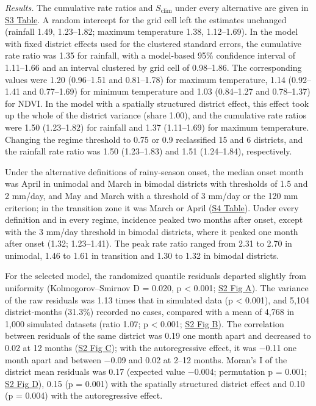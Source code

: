 \documentclass[11pt,a4paper]{article}
\begin{document}
\emph{Results.} The cumulative rate ratios and \(S_{\text{clim}}\) under every alternative are given in \hyperref[s3table]{S3 Table}. A random intercept for the grid cell left the estimates unchanged (rainfall 1.49, 1.23--1.82; maximum temperature 1.38, 1.12--1.69). In the model with fixed district effects used for the clustered standard errors, the cumulative rate ratio was 1.35 for rainfall, with a model-based 95\% confidence interval of 1.11--1.66 and an interval clustered by grid cell of 0.98--1.86. The corresponding values were 1.20 (0.96--1.51 and 0.81--1.78) for maximum temperature, 1.14 (0.92--1.41 and 0.77--1.69) for minimum temperature and 1.03 (0.84--1.27 and 0.78--1.37) for NDVI. In the model with a spatially structured district effect, this effect took up the whole of the district variance (share 1.00), and the cumulative rate ratios were 1.50 (1.23--1.82) for rainfall and 1.37 (1.11--1.69) for maximum temperature. Changing the regime threshold to 0.75 or 0.9 reclassified 15 and 6 districts, and the rainfall rate ratio was 1.50 (1.23--1.83) and 1.51 (1.24--1.84), respectively.

Under the alternative definitions of rainy-season onset, the median onset month was April in unimodal and March in bimodal districts with thresholds of 1.5 and 2 mm/day, and May and March with a threshold of 3 mm/day or the 120 mm criterion; in the transition zone it was March or April (\hyperref[s4table]{S4 Table}). Under every definition and in every regime, incidence peaked two months after onset, except with the 3 mm/day threshold in bimodal districts, where it peaked one month after onset (1.32; 1.23--1.41). The peak rate ratio ranged from 2.31 to 2.70 in unimodal, 1.46 to 1.61 in transition and 1.30 to 1.32 in bimodal districts.

For the selected model, the randomized quantile residuals departed slightly from uniformity (Kolmogorov--Smirnov D = 0.020, p \textless{} 0.001; \hyperref[s2fig]{S2 Fig A}). The variance of the raw residuals was 1.13 times that in simulated data (p \textless{} 0.001), and 5,104 district-months (31.3\%) recorded no cases, compared with a mean of 4,768 in 1,000 simulated datasets (ratio 1.07; p \textless{} 0.001; \hyperref[s2fig]{S2 Fig B}). The correlation between residuals of the same district was 0.19 one month apart and decreased to 0.02 at 12 months (\hyperref[s2fig]{S2 Fig C}); with the autoregressive effect, it was −0.11 one month apart and between −0.09 and 0.02 at 2--12 months. Moran's I of the district mean residuals was 0.17 (expected value −0.004; permutation p = 0.001; \hyperref[s2fig]{S2 Fig D}), 0.15 (p = 0.001) with the spatially structured district effect and 0.10 (p = 0.004) with the autoregressive effect.
\end{document}
